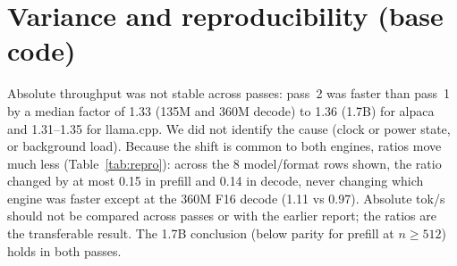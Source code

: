 \documentclass[10pt,twocolumn]{article}
\begin{document}
\section{Variance and reproducibility (base code)}
\label{sec:variance}
\begin{table}[t]\centering\small

\caption{Ratio alpaca/llama.cpp at 512 tokens in two independent passes of the whole grid.}
\label{tab:repro}
\end{table}
Absolute throughput was not stable across passes: pass~2 was faster than pass~1 by a median factor of 1.33 (135M and 360M decode) to 1.36 (1.7B) for alpaca and 1.31--1.35 for llama.cpp. We did not identify the cause (clock or power state, or background load). Because the shift is common to both engines, ratios move much less (Table~\ref{tab:repro}): across the 8 model/format rows shown, the ratio changed by at most 0.15 in prefill and 0.14 in decode, never changing which engine was faster except at the 360M F16 decode (1.11 vs 0.97). Absolute tok/s should not be compared across passes or with the earlier report; the ratios are the transferable result. The 1.7B conclusion (below parity for prefill at $n\ge512$) holds in both passes.
\end{document}
